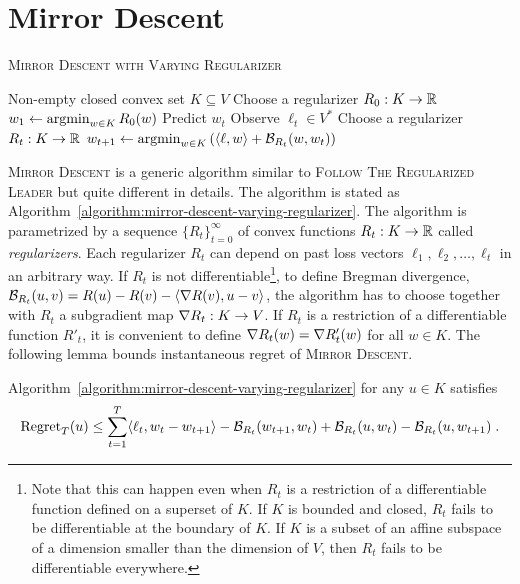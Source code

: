 \section{Mirror Descent}
\label{section:mirror-descent}

\begin{algorithm}[t]
\caption{\textsc{Mirror Descent with Varying Regularizer}}
\label{algorithm:mirror-descent-varying-regularizer}
\begin{algorithmic}[1]
\REQUIRE Non-empty closed convex set $K \subseteq V$
\STATE Choose a regularizer $R_0:K \to \mathbb{R}$
\STATE $w_1 \leftarrow \operatorname*{argmin}_{w \in K} R_0(w)$
\STATE Predict $w_t$
\STATE Observe $\ell_t \in V^*$
\STATE Choose a regularizer $R_t:K \to \mathbb{R}$
\STATE $w_{t+1} \leftarrow \operatorname*{argmin}_{w \in K} \left( \langle \ell, w \rangle + \mathcal{B}_{R_t}(w, w_t) \right)$
\ENDFOR
\end{algorithmic}
\end{algorithm}


\textsc{Mirror Descent} is a generic algorithm similar to \textsc{Follow The
Regularized Leader} but quite different in details. The algorithm is stated as
Algorithm~\ref{algorithm:mirror-descent-varying-regularizer}. The algorithm is
parametrized by a sequence $\{R_t\}_{t=0}^\infty$ of convex functions $R_t:K
\to \mathbb{R}$ called \emph{regularizers}. Each regularizer $R_t$ can depend on
past loss vectors $\ell_1, \ell_2, \dots, \ell_t$ in an
arbitrary way. If $R_t$ is not differentiable\footnote{Note that this can
happen even when $R_t$ is a restriction of a differentiable function defined on
a superset of $K$.  If $K$ is bounded and closed, $R_t$ fails to be
differentiable at the boundary of $K$. If $K$ is a subset of an affine subspace
of a dimension smaller than the dimension of $V$, then $R_t$ fails to be
differentiable everywhere.}, to define Bregman divergence, $\mathcal{B}_{R_t}(u,v) = R(u) - R(v) - \langle \nabla R(v), u - v \rangle$, the
algorithm has to choose together with $R_t$ a subgradient map $\nabla R_t:K \to
V$.  If $R_t$ is a restriction of a differentiable function $R'_t$, it is convenient
to define $\nabla R_t(w) = \nabla R'_t(w)$ for all $w \in K$. The following lemma
bounds instantaneous regret of \textsc{Mirror Descent}.

\begin{lemma}
Algorithm~\ref{algorithm:mirror-descent-varying-regularizer} for any $u \in K$ satisfies
$$
\operatorname{Regret}_T(u) \le \sum_{t=1}^T \langle \ell_t, w_t - w_{t+1} \rangle - \mathcal{B}_{R_t}(w_{t+1}, w_t) + \mathcal{B}_{R_t}(u,w_t) - \mathcal{B}_{R_t}(u, w_{t+1}) \; .
$$
\end{lemma}

